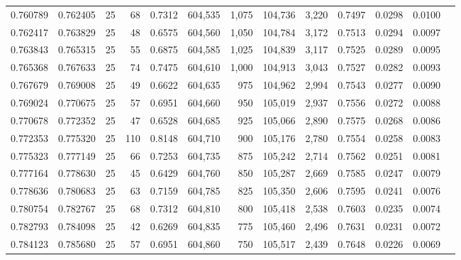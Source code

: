 \begin{tabular}{rrrrrrrrrrrrr}
0.760789 & 0.762405 &    25 &  68 &                                     0.7312 & 604,535 &   1,075 & 104,736 &   3,220 & 0.7497 & 0.0298 & 0.0100 \\
0.762417 & 0.763829 &    25 &  48 &                                     0.6575 & 604,560 &   1,050 & 104,784 &   3,172 & 0.7513 & 0.0294 & 0.0097 \\
0.763843 & 0.765315 &    25 &  55 &                                     0.6875 & 604,585 &   1,025 & 104,839 &   3,117 & 0.7525 & 0.0289 & 0.0095 \\
0.765368 & 0.767633 &    25 &  74 &                                     0.7475 & 604,610 &   1,000 & 104,913 &   3,043 & 0.7527 & 0.0282 & 0.0093 \\
0.767679 & 0.769008 &    25 &  49 &                                     0.6622 & 604,635 &     975 & 104,962 &   2,994 & 0.7543 & 0.0277 & 0.0090 \\
0.769024 & 0.770675 &    25 &  57 &                                     0.6951 & 604,660 &     950 & 105,019 &   2,937 & 0.7556 & 0.0272 & 0.0088 \\
0.770678 & 0.772352 &    25 &  47 &                                     0.6528 & 604,685 &     925 & 105,066 &   2,890 & 0.7575 & 0.0268 & 0.0086 \\
0.772353 & 0.775320 &    25 & 110 &                                     0.8148 & 604,710 &     900 & 105,176 &   2,780 & 0.7554 & 0.0258 & 0.0083 \\
0.775323 & 0.777149 &    25 &  66 &                                     0.7253 & 604,735 &     875 & 105,242 &   2,714 & 0.7562 & 0.0251 & 0.0081 \\
0.777164 & 0.778630 &    25 &  45 &                                     0.6429 & 604,760 &     850 & 105,287 &   2,669 & 0.7585 & 0.0247 & 0.0079 \\
0.778636 & 0.780683 &    25 &  63 &                                     0.7159 & 604,785 &     825 & 105,350 &   2,606 & 0.7595 & 0.0241 & 0.0076 \\
0.780754 & 0.782767 &    25 &  68 &                                     0.7312 & 604,810 &     800 & 105,418 &   2,538 & 0.7603 & 0.0235 & 0.0074 \\
0.782793 & 0.784098 &    25 &  42 &                                     0.6269 & 604,835 &     775 & 105,460 &   2,496 & 0.7631 & 0.0231 & 0.0072 \\
0.784123 & 0.785680 &    25 &  57 &                                     0.6951 & 604,860 &     750 & 105,517 &   2,439 & 0.7648 & 0.0226 & 0.0069 \\

\end{tabular}
